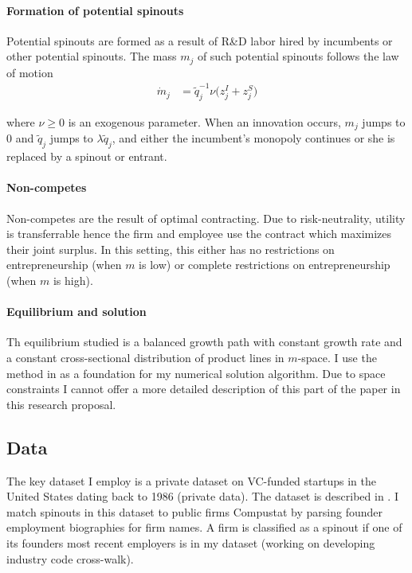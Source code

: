 \documentclass[11pt,english]{article}
\theoremstyle{remark}
\begin{document}
\paragraph{Formation of potential spinouts}

Potential spinouts are formed as a result of R\&D labor hired by incumbents or other potential spinouts. The mass $m_j$ of such potential spinouts follows the law of motion 
\begin{align*}
	\dot{m}_j &= \tilde{q}_j^{-1} \nu \big(z^I_j + z^S_j \big) 
\end{align*}

where $\nu \ge 0 $ is an exogenous parameter. When an innovation occurs, $m_j$ jumps to $0$ and $\tilde{q}_j$ jumps to $\lambda \tilde{q}_j$, and either the incumbent's monopoly continues or she is replaced by a spinout or entrant.

\paragraph{Non-competes}

Non-competes are the result of optimal contracting. Due to risk-neutrality, utility is transferrable hence the firm and employee use the contract which maximizes their joint surplus. In this setting, this either has no restrictions on entrepreneurship (when $m$ is low) or complete restrictions on entrepreneurship (when $m$ is high).

\paragraph{Equilibrium and solution}

Th equilibrium studied is a balanced growth path with constant growth rate and a constant cross-sectional distribution of product lines in $m$-space. I use the method in \cite{achdou_income_2017} as a foundation for my numerical solution algorithm. Due to space constraints I cannot offer a more detailed description of this part of the paper in this research proposal. 

\subsection*{Data}

The key dataset I employ is a private dataset on VC-funded startups in the United States dating back to 1986 (private data). The dataset is described in \cite{kaplan_how_2002}. I match spinouts in this dataset to public firms Compustat by parsing founder employment biographies for firm names. A firm is classified as a spinout if one of its founders most recent employers is in my dataset (working on developing industry code cross-walk). 
\end{document}
